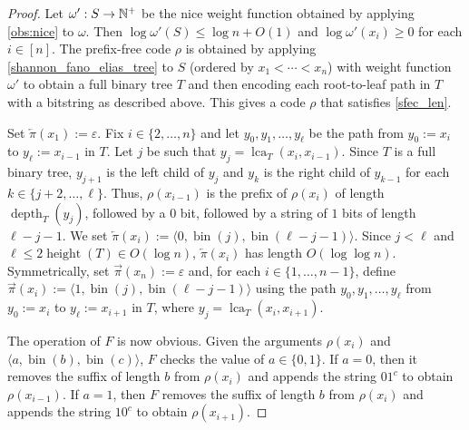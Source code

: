 \documentclass{patmorin}
\renewcommand{\ge}{\geqslant}
\renewcommand{\le}{\leqslant}
\DeclareMathOperator{\height}{height}
\DeclareMathOperator{\depth}{depth}
\DeclareMathOperator{\lca}{lca}
\DeclareMathOperator{\bin}{bin}
\begin{document}
\begin{proof}
  Let $\omega':S\to\mathbb{N}^+$ be the nice weight function obtained by applying \cref{obs:nice} to $\omega$.  Then $\log\omega'(S)\le\log n+ O(1)$ and $\log\omega'(x_i)\ge 0$ for each $i\in[n]$.
  The prefix-free code $\rho$ is obtained by applying \cref{shannon_fano_elias_tree} to $S$ (ordered by $x_1<\cdots<x_n$) with weight function $\omega'$ to obtain a full binary tree $T$ and then encoding each root-to-leaf path in $T$ with a bitstring as described above.  This gives a code $\rho$ that satisfies \ref{sfec_len}.
  
  Set $\overleftarrow{\pi}(x_1):=\varepsilon$. Fix $i\in\{2,\ldots,n\}$ and let $y_0,y_1,\ldots,y_\ell$ be the path from $y_0:=x_i$ to $y_\ell:=x_{i-1}$ in $T$.  Let $j$ be such that $y_j=\lca_T(x_i,x_{i-1})$.  Since $T$ is a full binary tree, $y_{j+1}$ is the left child of $y_j$ and $y_k$ is the right child of $y_{k-1}$ for each $k\in\{j+2,\ldots,\ell\}$.  Thus, $\rho(x_{i-1})$ is the prefix of $\rho(x_i)$ of length $\depth_T(y_j)$, followed by a $0$ bit, followed by a string of $1$ bits of length $\ell-j-1$.  We set $\overleftarrow{\pi}(x_i):=\langle 0, \bin(j), \bin(\ell-j-1)\rangle$.  Since $j <\ell$ and $\ell\le 2\height(T)\in O(\log n)$, $\overleftarrow{\pi}(x_i)$ has length $O(\log\log n)$.  Symmetrically, set $\overrightarrow{\pi}(x_n):=\varepsilon$ and, for each $i\in\{1,\ldots,n-1\}$, define $\overrightarrow{\pi}(x_i):=\langle 1, \bin(j), \bin(\ell-j-1)\rangle$ using the path $y_0,y_1,\ldots,y_\ell$ from $y_0:=x_i$ to $y_\ell:=x_{i+1}$ in $T$, where $y_j=\lca_T(x_i,x_{i+1})$.  

  The operation of $F$ is now obvious.  Given the arguments $\rho(x_i)$ and $\langle a,\bin(b),\bin(c)\rangle$, $F$ checks the value of $a\in\{0,1\}$.  If $a=0$, then it removes the suffix of length $b$ from $\rho(x_i)$ and appends the string $01^c$ to obtain $\rho(x_{i-1})$.  If $a=1$, then $F$ removes the suffix of length $b$ from $\rho(x_i)$ and appends the string $10^c$ to obtain $\rho(x_{i+1})$. 
\end{proof}




\end{document}

